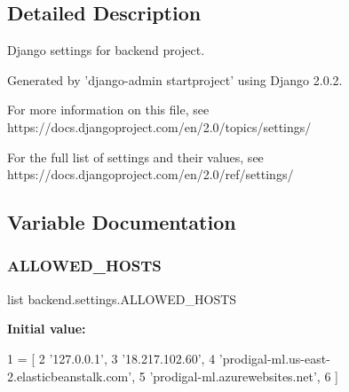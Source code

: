 \subsection{Detailed Description}
\begin{DoxyVerb}Django settings for backend project.

Generated by 'django-admin startproject' using Django 2.0.2.

For more information on this file, see
https://docs.djangoproject.com/en/2.0/topics/settings/

For the full list of settings and their values, see
https://docs.djangoproject.com/en/2.0/ref/settings/
\end{DoxyVerb}
 

\subsection{Variable Documentation}
\mbox{\label{namespacebackend_1_1settings_af21245644d1e2f502b8c165ce115b4cc}} 
\subsubsection{\texorpdfstring{A\+L\+L\+O\+W\+E\+D\+\_\+\+H\+O\+S\+TS}{ALLOWED\_HOSTS}}
{\footnotesize\ttfamily list backend.\+settings.\+A\+L\+L\+O\+W\+E\+D\+\_\+\+H\+O\+S\+TS}

{\bfseries Initial value\+:}
\begin{DoxyCode}
1 =  [
2     \textcolor{stringliteral}{'127.0.0.1'},
3     \textcolor{stringliteral}{'18.217.102.60'},
4     \textcolor{stringliteral}{'prodigal-ml.us-east-2.elasticbeanstalk.com'},
5     \textcolor{stringliteral}{'prodigal-ml.azurewebsites.net'}, 
6 ]
\end{DoxyCode}
\mbox{\label{namespacebackend_1_1settings_a2019bbe7c4da8114080da8f1c8f45b71}} 
